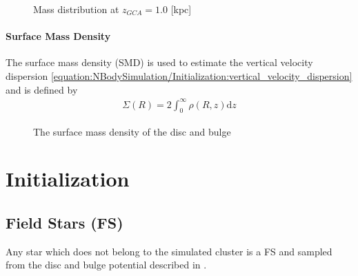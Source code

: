 \documentclass[letterpaper,10pt,english]{sphinxmanual}
\begin{document}
				\begin{figure}[htbp]
				\centering
				\capstart
				
				\noindent{}
				\caption{Mass distribution at \(z_{GCA} = 1.0\) {[}kpc{]}}\label{\detokenize{NBodySimulation/Potential:id10}}\label{\detokenize{NBodySimulation/Potential:fig-potential-mass-distribution}}\end{figure}
			
			
			\subsubsection{Surface Mass Density}
				\label{\detokenize{NBodySimulation/Potential:surface-mass-density}}
				\sphinxAtStartPar
				The surface mass density (SMD) is used to estimate the vertical velocity dispersion \eqref{equation:NBodySimulation/Initialization:vertical_velocity_dispersion} and is defined by
				\begin{equation}\label{equation:NBodySimulation/Potential:surface_mass_density}
				\begin{split}\Sigma \left ( R \right )=2\int_{0}^{\infty}\rho \left ( R,z \right )\mathrm{d}z\end{split}
				\end{equation}
				\begin{figure}[htbp]
				\centering
				\capstart
				
				\noindent{}
				\caption{The surface mass density of the disc and bulge}\label{\detokenize{NBodySimulation/Potential:id11}}\label{\detokenize{NBodySimulation/Potential:fig-potential-surface-density}}\end{figure}


\chapter{Initialization}
\label{\detokenize{NBodySimulation/Initialization:initialization}}\label{\detokenize{NBodySimulation/Initialization::doc}}


\section{Field Stars (FS)}
\label{\detokenize{NBodySimulation/Initialization:field-stars-fs}}
\sphinxAtStartPar
Any star which does not belong to the simulated cluster is a FS and sampled from the disc and bulge potential described in {\hyperref[\detokenize{NBodySimulation/Potential:galactic-potential-label}]{}}.
\end{document}
